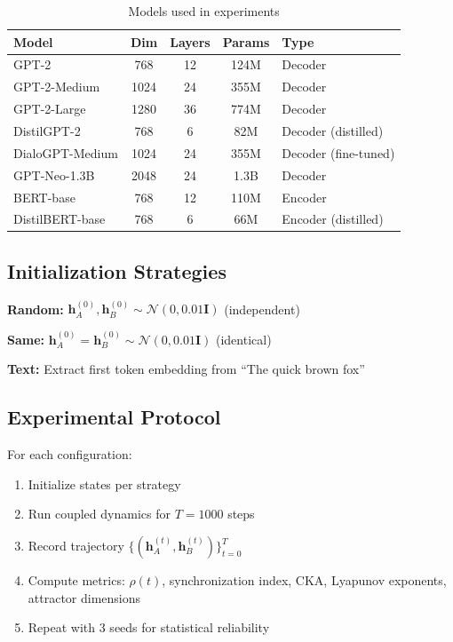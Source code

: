 \documentclass[10pt]{article} %
\theoremstyle{plain}
\theoremstyle{definition}
\theoremstyle{remark}
\renewcommand{\vect}[1]{\bm{#1}}
\newcommand{\mat}[1]{\mathbf{#1}}
\begin{document}
\begin{table}[htbp]
\centering
\caption{Models used in experiments}
\label{tab:models}
\small
\begin{tabular}{lcccl}
\toprule
\textbf{Model} & \textbf{Dim} & \textbf{Layers} & \textbf{Params} & \textbf{Type} \\
\midrule
GPT-2 & 768 & 12 & 124M & Decoder \\
GPT-2-Medium & 1024 & 24 & 355M & Decoder \\
GPT-2-Large & 1280 & 36 & 774M & Decoder \\
DistilGPT-2 & 768 & 6 & 82M & Decoder (distilled) \\
DialoGPT-Medium & 1024 & 24 & 355M & Decoder (fine-tuned) \\
\midrule
GPT-Neo-1.3B & 2048 & 24 & 1.3B & Decoder \\
\midrule
BERT-base & 768 & 12 & 110M & Encoder \\
DistilBERT-base & 768 & 6 & 66M & Encoder (distilled) \\
\bottomrule
\end{tabular}
\end{table}

\subsection{Initialization Strategies}

\textbf{Random:} $\vect{h}_A^{(0)}, \vect{h}_B^{(0)} \sim \mathcal{N}(0, 0.01\mat{I})$ (independent)

\textbf{Same:} $\vect{h}_A^{(0)} = \vect{h}_B^{(0)} \sim \mathcal{N}(0, 0.01\mat{I})$ (identical)

\textbf{Text:} Extract first token embedding from ``The quick brown fox''

\subsection{Experimental Protocol}

For each configuration:
\begin{enumerate}
    \item Initialize states per strategy
    \item Run coupled dynamics for $T = 1000$ steps
    \item Record trajectory $\{(\vect{h}_A^{(t)}, \vect{h}_B^{(t)})\}_{t=0}^{T}$
    \item Compute metrics: $\rho(t)$, synchronization index, CKA, Lyapunov exponents, attractor dimensions
    \item Repeat with 3 seeds for statistical reliability
\end{enumerate}
\end{document}
